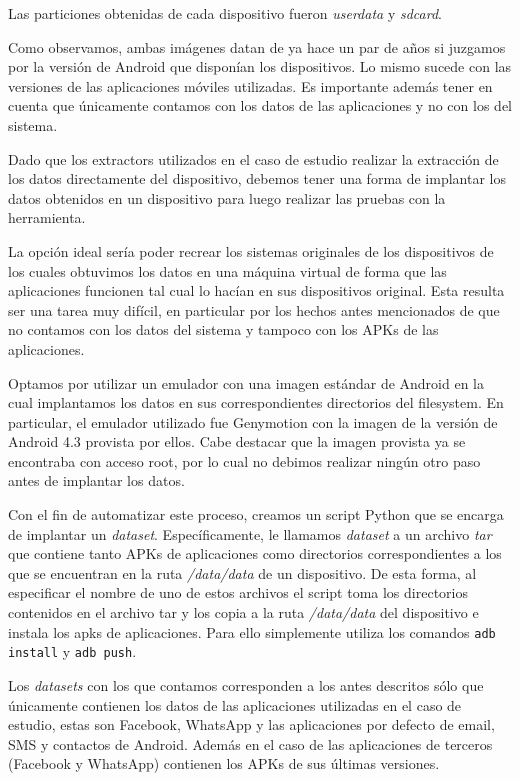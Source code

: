 Las particiones obtenidas de cada dispositivo fueron \emph{userdata} y \emph{sdcard}.

Como observamos, ambas imágenes datan de ya hace un par de años si juzgamos por la versión de Android que disponían los dispositivos. Lo mismo sucede con las versiones de las aplicaciones móviles utilizadas. Es importante además tener en cuenta que únicamente contamos con los datos de las aplicaciones y no con los del sistema.

Dado que los extractors utilizados en el caso de estudio realizar la extracción de los datos directamente del dispositivo, debemos tener una forma de implantar los datos obtenidos en un dispositivo para luego realizar las pruebas con la herramienta.

La opción ideal sería poder recrear los sistemas originales de los dispositivos de los cuales obtuvimos los datos en una máquina virtual de forma que las aplicaciones funcionen tal cual lo hacían en sus dispositivos original. Esta resulta ser una tarea muy difícil, en particular por los hechos antes mencionados de que no contamos con los datos del sistema y tampoco con los APKs de las aplicaciones.

Optamos por utilizar un emulador con una imagen estándar de Android en la cual implantamos los datos en sus correspondientes directorios del filesystem. En particular, el emulador utilizado fue Genymotion \cite{genymotion} con la imagen de la versión de Android 4.3 provista por ellos. Cabe destacar que la imagen provista ya se encontraba con acceso root, por lo cual no debimos realizar ningún otro paso antes de implantar los datos.

Con el fin de automatizar este proceso, creamos un script Python que se encarga de implantar un \emph{dataset}. Específicamente, le llamamos \emph{dataset} a un archivo \emph{tar} que contiene tanto APKs de aplicaciones como directorios correspondientes a los que se encuentran en la ruta \emph{/data/data} de un dispositivo. De esta forma, al especificar el nombre de uno de estos archivos el script toma los directorios contenidos en el archivo tar y los copia a la ruta \emph{/data/data} del dispositivo e instala los apks de aplicaciones. Para ello simplemente utiliza los comandos \texttt{adb install} y \texttt{adb push}.

Los \emph{datasets} con los que contamos corresponden a los antes descritos sólo que únicamente contienen los datos de las aplicaciones utilizadas en el caso de estudio, estas son Facebook, WhatsApp y las aplicaciones por defecto de email, SMS y contactos de Android. Además en el caso de las aplicaciones de terceros (Facebook y WhatsApp) contienen los APKs de sus últimas versiones.


